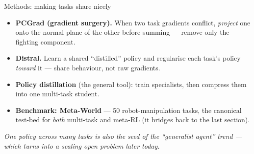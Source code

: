 \begin{frame}{Methods: making tasks share nicely}
\begin{itemize}\footnotesize\itemsep0.55em
    \item \textbf{PCGrad (gradient surgery).} When two task gradients conflict, \emph{project}
          one onto the normal plane of the other before summing --- remove only the
          fighting component. 
    \item \textbf{Distral.} Learn a shared ``distilled'' policy and regularise each task's
          policy \emph{toward} it --- share behaviour, not raw gradients.
    \item \textbf{Policy distillation} (the general tool): train specialists, then compress
          them into one multi-task student.
    \item \textbf{Benchmark: Meta-World} --- 50 robot-manipulation tasks, the canonical
          test-bed for \emph{both} multi-task and meta-RL (it bridges back to the last
          section). 
\end{itemize}
\vfill
\begin{center}\footnotesize\itshape
One policy across many tasks is also the seed of the ``generalist agent'' trend --- which
turns into a \emph{scaling} open problem later today.
\end{center}
\end{frame}
